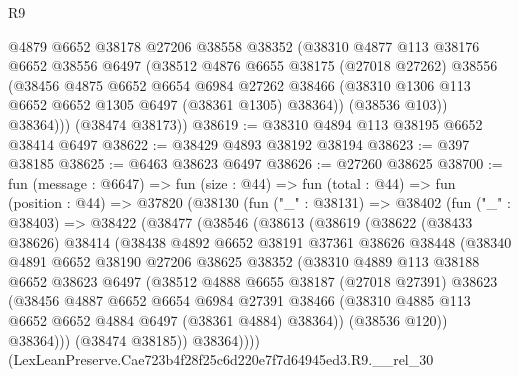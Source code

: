 \begin{lexlean}{R9}
\begin{coremodule}
          @4879
          @6652
          @38178
          @27206
          @38558
          @38352
          (@38310
            @4877
            @113
            @38176
            @6652
            @38556
            @6497
            (@38512
              @4876
              @6655
              @38175
              (@27018 @27262)
              @38556
              (@38456
                @4875
                @6652
                @6654
                @6984
                @27262
                @38466
                (@38310 @1306 @113 @6652 @6652 @1305 @6497 (@38361 @1305) @38364))
              (@38536 @103))
            @38364)))
      (@38474 @38173))
@38619 := @38310 @4894 @113 @38195 @6652 @38414 @6497
@38622 := @38429 @4893 @38192 @38194
@38623 := @397 @38185
@38625 := @6463 @38623 @6497
@38626 := @27260 @38625
@38700 := fun (message : @6647) =>
  fun (size : @44) =>
  fun (total : @44) =>
  fun (position : @44) =>
  @37820
    (@38130
      (fun ("_" : @38131) =>
      @38402
        (fun ("_" : @38403) =>
        @38422
          (@38477
            (@38546
              (@38613
                (@38619
                  (@38622
                    (@38433 @38626)
                    @38414
                    (@38438
                      @4892
                      @6652
                      @38191
                      @37361
                      @38626
                      @38448
                      (@38340
                        @4891
                        @6652
                        @38190
                        @27206
                        @38625
                        @38352
                        (@38310
                          @4889
                          @113
                          @38188
                          @6652
                          @38623
                          @6497
                          (@38512
                            @4888
                            @6655
                            @38187
                            (@27018 @27391)
                            @38623
                            (@38456
                              @4887
                              @6652
                              @6654
                              @6984
                              @27391
                              @38466
                              (@38310 @4885 @113 @6652 @6652 @4884 @6497 (@38361 @4884) @38364))
                            (@38536 @120))
                          @38364)))
                    (@38474 @38185))
                  @38364))))
          (LexLeanPreserve.Cae723b4f28f25c6d220e7f7d64945ed3.R9.__rel_30

\end{coremodule}
\end{lexlean}
